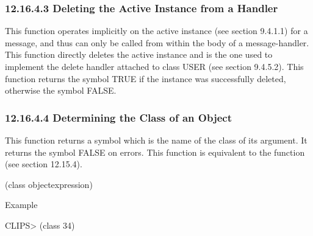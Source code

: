 \documentclass[letterpaper,10pt,english]{sphinxmanual}
\begin{document}

\begin{sphinxVerbatim}[commandchars=\\\{\}]
 
\end{sphinxVerbatim}


\subsubsection{12.16.4.3 Deleting the Active Instance from a Handler}
\label{\detokenize{actions:deleting-the-active-instance-from-a-handler}}
This function operates implicitly on the active instance (see section
9.4.1.1) for a message, and thus can only be called from within the body
of a message-handler. This function directly deletes the active instance
and is the one used to implement the delete handler attached to class
USER (see section 9.4.5.2). This function returns the symbol TRUE if the
instance was successfully deleted, otherwise the symbol FALSE.


\begin{sphinxVerbatim}[commandchars=\\\{\}]
\end{sphinxVerbatim}


\subsubsection{12.16.4.4 Determining the Class of an Object}
\label{\detokenize{actions:determining-the-class-of-an-object}}
This function returns a symbol which is the name of the class of its
argument. It returns the symbol FALSE on errors. This function is
equivalent to the  function (see section 12.15.4).


\begin{sphinxVerbatim}[commandchars=\\\{\}]
(class \PYGZlt{}object\PYGZhy{}expression\PYGZgt{})
\end{sphinxVerbatim}

Example

CLIPS\textgreater{} (class 34)
\end{document}
